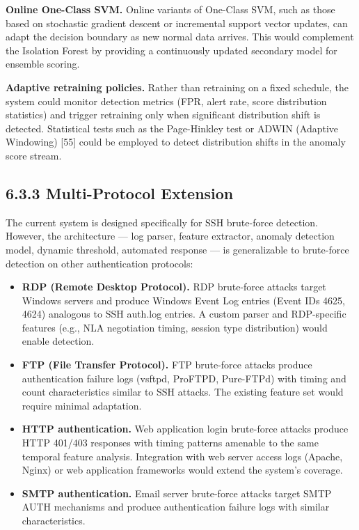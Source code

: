 \documentclass[
  a4paper]{report}
\providecommand{\tightlist}{%
  \setlength{\itemsep}{0pt}\setlength{\parskip}{0pt}}
\begin{document}
\textbf{Online One-Class SVM.} Online variants of One-Class SVM, such as
those based on stochastic gradient descent or incremental support vector
updates, can adapt the decision boundary as new normal data arrives.
This would complement the Isolation Forest by providing a continuously
updated secondary model for ensemble scoring.

\textbf{Adaptive retraining policies.} Rather than retraining on a fixed
schedule, the system could monitor detection metrics (FPR, alert rate,
score distribution statistics) and trigger retraining only when
significant distribution shift is detected. Statistical tests such as
the Page-Hinkley test or ADWIN (Adaptive Windowing) {[}55{]} could be
employed to detect distribution shifts in the anomaly score stream.

\subsection{6.3.3 Multi-Protocol
Extension}\label{multi-protocol-extension}

The current system is designed specifically for SSH brute-force
detection. However, the architecture --- log parser, feature extractor,
anomaly detection model, dynamic threshold, automated response --- is
generalizable to brute-force detection on other authentication
protocols:

\begin{itemize}
\tightlist
\item
  \textbf{RDP (Remote Desktop Protocol).} RDP brute-force attacks target
  Windows servers and produce Windows Event Log entries (Event IDs 4625,
  4624) analogous to SSH auth.log entries. A custom parser and
  RDP-specific features (e.g., NLA negotiation timing, session type
  distribution) would enable detection.
\item
  \textbf{FTP (File Transfer Protocol).} FTP brute-force attacks produce
  authentication failure logs (vsftpd, ProFTPD, Pure-FTPd) with timing
  and count characteristics similar to SSH attacks. The existing feature
  set would require minimal adaptation.
\item
  \textbf{HTTP authentication.} Web application login brute-force
  attacks produce HTTP 401/403 responses with timing patterns amenable
  to the same temporal feature analysis. Integration with web server
  access logs (Apache, Nginx) or web application frameworks would extend
  the system's coverage.
\item
  \textbf{SMTP authentication.} Email server brute-force attacks target
  SMTP AUTH mechanisms and produce authentication failure logs with
  similar characteristics.
\end{itemize}
\end{document}
